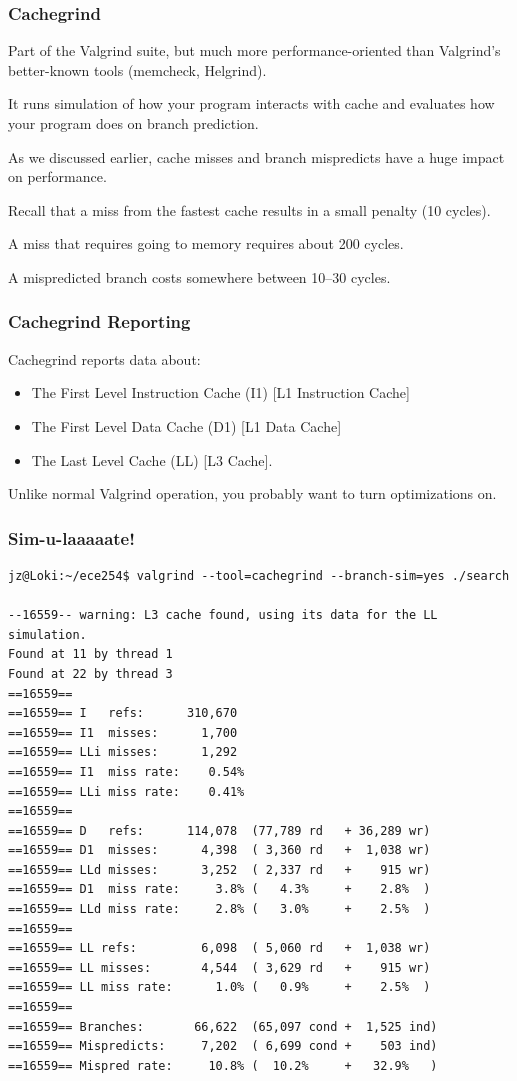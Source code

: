 \begin{frame}
\frametitle{Cachegrind}

Part of the Valgrind suite, but much more performance-oriented than Valgrind's better-known tools (memcheck, Helgrind). 

 It runs simulation of how your program interacts with cache and evaluates how your program does on branch prediction.
 
 As we discussed earlier, cache misses and branch mispredicts have a huge impact on performance.
 
 Recall that a miss from the fastest cache results in a small penalty (10 cycles).
 
 A miss that requires going to memory requires about 200 cycles. 
 
 A mispredicted branch costs somewhere between 10--30 cycles.


\end{frame}

\begin{frame}
\frametitle{Cachegrind Reporting}

Cachegrind reports data about:
\begin{itemize}
	\item The First Level Instruction Cache (I1) [L1 Instruction Cache]
	\item The First Level Data Cache (D1) [L1 Data Cache]
	\item The Last Level Cache (LL) [L3 Cache].
\end{itemize}

Unlike normal Valgrind operation, you probably want to turn optimizations on.

\end{frame}

\begin{frame}[fragile]
\frametitle{Sim-u-laaaaate!}
{\scriptsize

\begin{verbatim}
jz@Loki:~/ece254$ valgrind --tool=cachegrind --branch-sim=yes ./search

--16559-- warning: L3 cache found, using its data for the LL simulation.
Found at 11 by thread 1 
Found at 22 by thread 3 
==16559== 
==16559== I   refs:      310,670
==16559== I1  misses:      1,700
==16559== LLi misses:      1,292
==16559== I1  miss rate:    0.54%
==16559== LLi miss rate:    0.41%
==16559== 
==16559== D   refs:      114,078  (77,789 rd   + 36,289 wr)
==16559== D1  misses:      4,398  ( 3,360 rd   +  1,038 wr)
==16559== LLd misses:      3,252  ( 2,337 rd   +    915 wr)
==16559== D1  miss rate:     3.8% (   4.3%     +    2.8%  )
==16559== LLd miss rate:     2.8% (   3.0%     +    2.5%  )
==16559== 
==16559== LL refs:         6,098  ( 5,060 rd   +  1,038 wr)
==16559== LL misses:       4,544  ( 3,629 rd   +    915 wr)
==16559== LL miss rate:      1.0% (   0.9%     +    2.5%  )
==16559== 
==16559== Branches:       66,622  (65,097 cond +  1,525 ind)
==16559== Mispredicts:     7,202  ( 6,699 cond +    503 ind)
==16559== Mispred rate:     10.8% (  10.2%     +   32.9%   )

\end{verbatim}
}

\end{frame}

